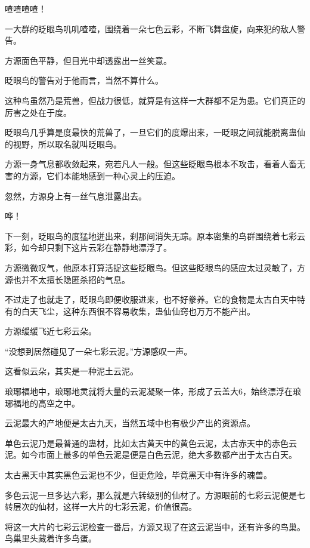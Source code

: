 
\begin{this_body}



喳喳喳喳！

一大群的眨眼鸟叽叽喳喳，围绕着一朵七色云彩，不断飞舞盘旋，向来犯的敌人警告。

方源面色平静，但目光中却透露出一丝笑意。

眨眼鸟的警告对于他而言，当然不算什么。

这种鸟虽然乃是荒兽，但战力很低，就算是有这样一大群都不足为患。它们真正的厉害之处在于度。

眨眼鸟几乎算是度最快的荒兽了，一旦它们的度爆出来，一眨眼之间就能脱离蛊仙的视野，所以取名就叫眨眼鸟。

方源一身气息都收敛起来，宛若凡人一般。但这些眨眼鸟根本不攻击，看着人畜无害的方源，它们本能地感到一种心灵上的压迫。

忽然，方源身上有一丝气息泄露出去。

哗！

下一刻，眨眼鸟的度猛地迸出来，刹那间消失无踪。原本密集的鸟群围绕着七彩云彩，如今却只剩下这片云彩在静静地漂浮了。

方源微微叹气，他原本打算活捉这些眨眼鸟。但这些眨眼鸟的感应太过灵敏了，方源也并不太擅长隐匿杀招的气息。

不过走了也就走了，眨眼鸟即便收服进来，也不好豢养。它的食物是太古白天中特有的白天飞尘，这种东西很不容易收集，蛊仙仙窍也万万不能产出。

方源缓缓飞近七彩云朵。

“没想到居然碰见了一朵七彩云泥。”方源感叹一声。

这看似云朵，其实是一种泥土云泥。

琅琊福地中，琅琊地灵就将大量的云泥凝聚一体，形成了云盖大6，始终漂浮在琅琊福地的高空之中。

云泥最大的产地便是太古九天，当然五域中也有极少产出的资源点。

单色云泥乃是最普通的蛊材，比如太古黄天中的黄色云泥，太古赤天中的赤色云泥。如今市面上最多的单色云泥是便是白色云泥，绝大多数都产出于太古白天。

太古黑天中其实黑色云泥也不少，但更危险，毕竟黑天中有许多的魂兽。

多色云泥一旦多达六彩，那么就是六转级别的仙材了。方源眼前的七彩云泥便是七转层次的仙材，这样一大片的七彩云泥，价值很高。

将这一大片的七彩云泥检查一番后，方源又现了在这云泥当中，还有许多的鸟巢。鸟巢里头藏着许多鸟蛋。


\end{this_body}
